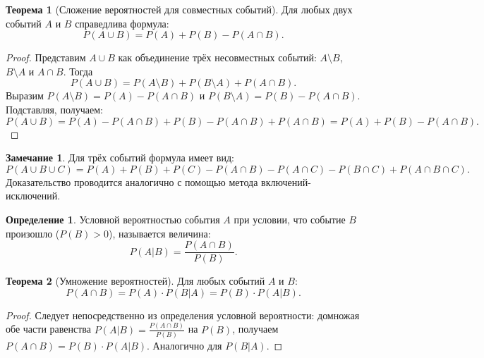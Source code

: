 \documentclass[a4paper]{article}
\theoremstyle{definition}
\newtheorem{definition}{Определение}[subsection]
\newtheorem{theorem}{Теорема}[subsection]
\newtheorem{remark}{Замечание}[subsection]
\begin{document}
\begin{theorem}[Сложение вероятностей для совместных событий]
Для любых двух событий $A$ и $B$ справедлива формула:
\begin{equation}
    P(A \cup B) = P(A) + P(B) - P(A \cap B). \tag{4}
\end{equation}
\end{theorem}

\begin{proof}
Представим $A \cup B$ как объединение трёх несовместных событий: $A \setminus B$, $B \setminus A$ и $A \cap B$. Тогда
\[
P(A \cup B) = P(A \setminus B) + P(B \setminus A) + P(A \cap B).
\]
Выразим $P(A \setminus B) = P(A) - P(A \cap B)$ и $P(B \setminus A) = P(B) - P(A \cap B)$. Подставляя, получаем:
\[
P(A \cup B) = P(A) - P(A \cap B) + P(B) - P(A \cap B) + P(A \cap B) = P(A) + P(B) - P(A \cap B).
\]
\end{proof}

\begin{remark}
Для трёх событий формула имеет вид:
\begin{equation}
    P(A \cup B \cup C) = P(A) + P(B) + P(C) - P(A \cap B) - P(A \cap C) - P(B \cap C) + P(A \cap B \cap C). \tag{5}
\end{equation}
Доказательство проводится аналогично с помощью метода включений-исключений.
\end{remark}

\begin{definition}
Условной вероятностью события $A$ при условии, что событие $B$ произошло ($P(B) > 0$), называется величина:
\begin{equation}
    P(A|B) = \frac{P(A \cap B)}{P(B)}. \tag{6}
\end{equation}
\end{definition}

\begin{theorem}[Умножение вероятностей]
Для любых событий $A$ и $B$:
\begin{equation}
    P(A \cap B) = P(A) \cdot P(B|A) = P(B) \cdot P(A|B). \tag{7}
\end{equation}
\end{theorem}

\begin{proof}
Следует непосредственно из определения условной вероятности: домножая обе части равенства $P(A|B) = \frac{P(A \cap B)}{P(B)}$ на $P(B)$, получаем $P(A \cap B) = P(B) \cdot P(A|B)$. Аналогично для $P(B|A)$.
\end{proof}
\end{document}
